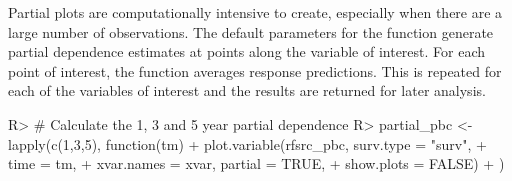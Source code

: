 \documentclass[nojss]{jss}\usepackage[]{graphicx}\usepackage[]{color}
\begin{document}
Partial plots are computationally intensive to create, especially when there are a large number of observations. The default parameters for the  function generate partial dependence estimates at  points along the variable of interest. For each point of interest, the  function averages  response predictions. This is repeated for each of the variables of interest and the results are returned for later analysis. 

\begin{Schunk}
\begin{Sinput}
R> # Calculate the 1, 3 and 5 year partial dependence
R> partial_pbc <- lapply(c(1,3,5), function(tm){
+   plot.variable(rfsrc_pbc, surv.type = "surv", 
+                 time = tm, 
+                 xvar.names = xvar, partial = TRUE, 
+                 show.plots = FALSE)
+   })
\end{Sinput}
\end{Schunk}
\end{document}
